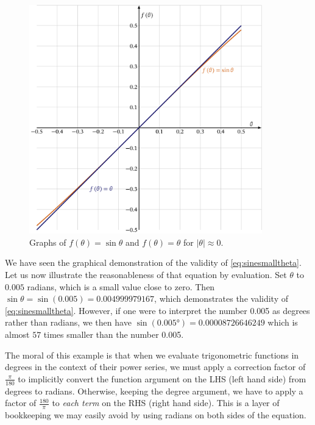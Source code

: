 \documentclass[
  a4paper,
]{article}
\begin{document}
\begin{figure}
\hypertarget{fig:xsinx}{%
\centering
\includegraphics[width=0.9\textwidth,height=\textheight]{images/xsinx.png}
\caption{Graphs of \(f(\theta)= \sin\theta\) and \(f(\theta) = \theta\)
for \(\lvert\theta\rvert\approx 0\).}\label{fig:xsinx}
}
\end{figure}

We have seen the graphical demonstration of the validity of
\cref{eq:sinesmalltheta}. Let us now illustrate the reasonableness of
that equation by evaluation. Set \(\theta\) to \(0.005\) radians, which
is a small value close to zero. Then
\(\sin\theta = \sin(0.005) = 0.004999979167\), which demonstrates the
validity of \cref{eq:sinesmalltheta}. However, if one were to interpret
the number 0.005 as degrees rather than radians, we then have
\(\sin(0.005°) = 0.00008726646249\) which is almost \(57\) times smaller
than the number 0.005.

The moral of this example is that when we evaluate trigonometric
functions in degrees in the context of their power series, we must apply
a correction factor of \(\frac{\pi}{180}\) to implicitly convert the
function argument on the LHS (left hand side) from degrees to radians.
Otherwise, keeping the degree argument, we have to apply a factor of
\(\frac{180}{\pi}\) to \emph{each term} on the RHS (right hand side).
This is a layer of bookkeeping we may easily avoid by using radians on
both sides of the equation.
\end{document}
